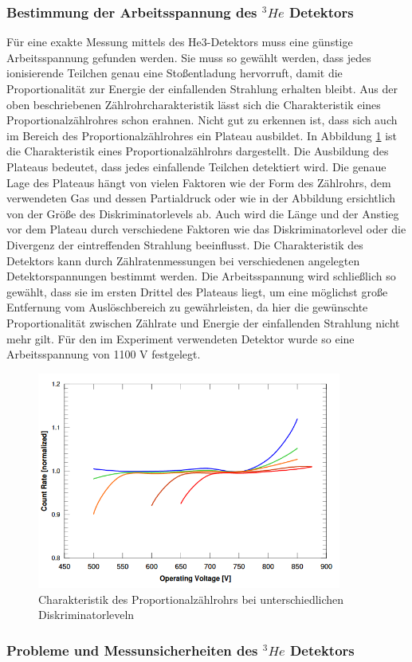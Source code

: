 \subsubsection{Bestimmung der Arbeitsspannung des $^3He$ Detektors}
Für eine exakte Messung mittels des He3-Detektors muss eine günstige Arbeitsspannung gefunden werden. Sie muss so gewählt werden, dass jedes ionisierende Teilchen genau eine Stoßentladung hervorruft, damit die Proportionalität zur Energie der einfallenden Strahlung erhalten bleibt. 
Aus der oben beschriebenen Zählrohrcharakteristik lässt sich die Charakteristik eines Proportionalzählrohres schon erahnen. Nicht gut zu erkennen ist, dass sich auch im Bereich des Proportionalzählrohres ein Plateau ausbildet. In Abbildung \ref{charakteristik} ist die Charakteristik eines Proportionalzählrohrs dargestellt. Die Ausbildung des Plateaus bedeutet, dass jedes einfallende Teilchen detektiert wird. Die genaue Lage des Plateaus hängt von vielen Faktoren wie der Form des Zählrohrs, dem verwendeten Gas und dessen Partialdruck oder wie in der Abbildung ersichtlich von der Größe des Diskriminatorlevels ab. Auch wird die Länge und der Anstieg vor dem Plateau durch verschiedene Faktoren wie das Diskriminatorlevel oder die Divergenz der eintreffenden Strahlung beeinflusst. Die Charakteristik des Detektors kann durch Zählratenmessungen bei verschiedenen angelegten Detektorspannungen bestimmt werden. Die Arbeitsspannung wird schließlich so gewählt, dass sie im ersten Drittel des Plateaus liegt, um eine möglichst große Entfernung vom Auslöschbereich zu gewährleisten, da hier die gewünschte Proportionalität zwischen Zählrate und Energie der einfallenden Strahlung nicht mehr gilt. Für den im Experiment verwendeten Detektor wurde so eine Arbeitsspannung von 1100 V festgelegt.  

\begin{figure} [!htb]
	\includegraphics [width=10cm] {pics/characteristic_proportional_counter.png}
	\centering
	\caption {Charakteristik des Proportionalzählrohrs bei unterschiedlichen Diskriminatorleveln \protect\footnotemark }
	\label{charakteristik}
\end{figure}

\subsubsection{Probleme und Messunsicherheiten des $^3He$ Detektors}








